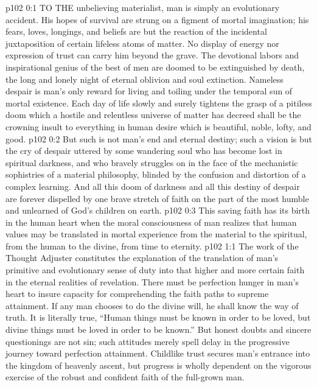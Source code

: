 \vs p102 0:1 TO THE unbelieving materialist, man is simply an evolutionary accident. His hopes of survival are strung on a figment of mortal imagination; his fears, loves, longings, and beliefs are but the reaction of the incidental juxtaposition of certain lifeless atoms of matter. No display of energy nor expression of trust can carry him beyond the grave. The devotional labors and inspirational genius of the best of men are doomed to be extinguished by death, the long and lonely night of eternal oblivion and soul extinction. Nameless despair is man’s only reward for living and toiling under the temporal sun of mortal existence. Each day of life slowly and surely tightens the grasp of a pitiless doom which a hostile and relentless universe of matter has decreed shall be the crowning insult to everything in human desire which is beautiful, noble, lofty, and good.
\vs p102 0:2 But such is not man’s end and eternal destiny; such a vision is but the cry of despair uttered by some wandering soul who has become lost in spiritual darkness, and who bravely struggles on in the face of the mechanistic sophistries of a material philosophy, blinded by the confusion and distortion of a complex learning. And all this doom of darkness and all this destiny of despair are forever dispelled by one brave stretch of faith on the part of the most humble and unlearned of God’s children on earth.
\vs p102 0:3 This saving faith has its birth in the human heart when the moral consciousness of man realizes that human values may be translated in mortal experience from the material to the spiritual, from the human to the divine, from time to eternity.
\vs p102 1:1 The work of the Thought Adjuster constitutes the explanation of the translation of man’s primitive and evolutionary sense of duty into that higher and more certain faith in the eternal realities of revelation. There must be perfection hunger in man’s heart to insure capacity for comprehending the faith paths to supreme attainment. If any man chooses to do the divine will, he shall know the way of truth. It is literally true, “Human things must be known in order to be loved, but divine things must be loved in order to be known.” But honest doubts and sincere questionings are not sin; such attitudes merely spell delay in the progressive journey toward perfection attainment. Childlike trust secures man’s entrance into the kingdom of heavenly ascent, but progress is wholly dependent on the vigorous exercise of the robust and confident faith of the full\hyp{}grown man.
